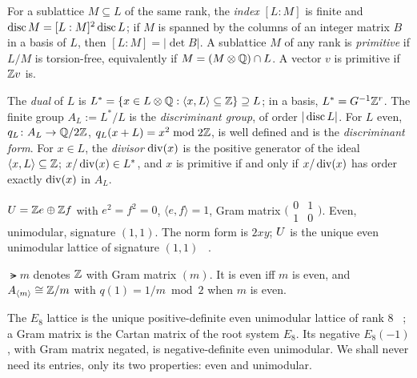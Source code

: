 \begin{definition}
For a sublattice $M\subseteq L$ of the same rank, the \emph{index} $[L:M]$ is
finite and $\operatorname{disc} M=[L:M]^2\operatorname{disc} L$; if $M$ is spanned by the columns of an
integer matrix $B$ in a basis of $L$, then $[L:M]=|\det B|$. A sublattice $M$
of any rank is \emph{primitive} if $L/M$ is torsion-free, equivalently if
$M=(M\otimes\mathbb{Q})\cap L$. A vector $v$ is primitive if $\mathbb{Z} v$ is.
\end{definition}

\begin{definition}
The \emph{dual} of $L$ is $L^*=\{x\in L\otimes\mathbb{Q}:\langle x,L\rangle\subseteq\mathbb{Z}\}
\supseteq L$; in a basis, $L^*=G^{-1}\mathbb{Z}^r$. The finite group
$A_L:=L^*/L$ is the \emph{discriminant group}, of order $|\operatorname{disc} L|$. For $L$
even, $q_L\colon A_L\to\mathbb{Q}/2\mathbb{Z}$, $q_L(x+L)=x^2\bmod 2\mathbb{Z}$, is well defined and is
the \emph{discriminant form}. For $x\in L$, the \emph{divisor}
$\operatorname{div}(x)$ is the positive generator of the ideal $\langle x,L\rangle\subseteq\mathbb{Z}$;
$x/\operatorname{div}(x)\in L^*$, and $x$ is primitive if and only if $x/\operatorname{div}(x)$ has order
exactly $\operatorname{div}(x)$ in $A_L$.
\end{definition}

\begin{example}\label{ex:U}
$U=\mathbb{Z} e\oplus\mathbb{Z} f$ with $e^2=f^2=0$, $\langle e,f\rangle=1$, Gram matrix
$\bigl(\begin{smallmatrix}0&1\\1&0\end{smallmatrix}\bigr)$. Even, unimodular,
signature $(1,1)$. The norm form is $2xy$; $U$ is the unique even
unimodular lattice of signature $(1,1)$ \Lstatus~\cite[Ch.~14]{Huybrechts2016}.
\end{example}

\begin{example}
$\lat{m}$ denotes $\mathbb{Z}$ with Gram matrix $(m)$. It is even iff $m$ is even, and
$A_{\langle m\rangle}\cong\mathbb{Z}/m$ with $q(1)=1/m\bmod2$ when $m$ is even.
\end{example}

\begin{example}[$E_8$]
The $E_8$ lattice is the unique positive-definite even unimodular lattice of
rank $8$ \Lstatus~\cite[Ch.~4]{ConwaySloane1999}; a Gram matrix is the Cartan
matrix of the root system $E_8$. Its negative $E_8(-1)$, with Gram matrix
negated, is negative-definite even unimodular. We shall never need its
entries, only its two properties: even and unimodular.
\end{example}

